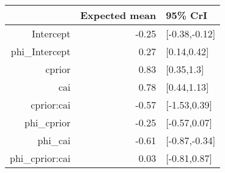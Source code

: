 \begin{tabular}{rrl}
  \hline
 & Expected mean & 95\% CrI \\ 
  \hline
Intercept & -0.25 & [-0.38,-0.12] \\ 
  phi\_Intercept & 0.27 & [0.14,0.42] \\ 
  cprior & 0.83 & [0.35,1.3] \\ 
  cai & 0.78 & [0.44,1.13] \\ 
  cprior:cai & -0.57 & [-1.53,0.39] \\ 
  phi\_cprior & -0.25 & [-0.57,0.07] \\ 
  phi\_cai & -0.61 & [-0.87,-0.34] \\ 
  phi\_cprior:cai & 0.03 & [-0.81,0.87] \\ 
   \hline
\end{tabular}

